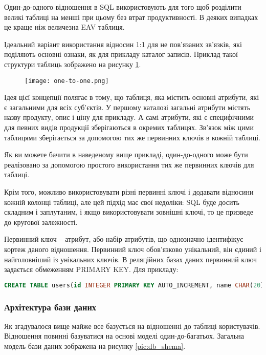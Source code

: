 \par Один-до-одного відношення в SQL використовують для того щоб розділити великі таблиці на менші при цьому без втрат продуктивності. В деяких випадках це краще ніж величезна EAV \cite{EAV} таблиця. 
\par Ідеальний варіант використання відносин 1:1 для не пов'язаних зв'язків, які поділяють основні ознаки, як для прикладу каталог записів. Приклад такої структури таблиць зображено на рисунку \ref{pic:one_to_one.png}.
\begin{figure}[!ht]
\centering
		\texttt{[image: one-to-one.png]}
		\vspace{18pt}
		\label{pic:one_to_one.png}
\end{figure}
\par Ідея цієї концепції полягає в тому, що таблиця, яка містить основні атрибути, які є загальними для всіх суб'єктів. У першому каталозі загальні атрибути містять назву продукту, опис і ціну для прикладу. А самі атрибути, які є специфічними для певних видів продукції зберігаються в окремих таблицях. Зв'язок між цими таблицями зберігається за допомогою тих же первинних ключів в кожній таблиці.
\par Як ви можете бачити в наведеному вище прикладі, один-до-одного може бути реалізовано за допомогою простого використання тих же первинних ключів для таблиці. 
\par Крім того, можливо використовувати різні первинні ключі і додавати відносини кожній колонці таблиці, але цей підхід має свої недоліки: SQL буде досить складним і заплутаним, і якщо використовувати зовнішні ключі, то це призведе до кругової залежності.
\par Первинний ключ -- атрибут, або набір атрибутів, що однозначно ідентифікує кортеж даного відношення. Первинний ключ обов'язково унікальний, він єдиний і найголовніший із унікальних ключів.
В реляційних базах даних первинний ключ задається обмеженням PRIMARY KEY. Для прикладу:
\begin{lstlisting}[language=SQL]
CREATE TABLE users(id INTEGER PRIMARY KEY AUTO_INCREMENT, name CHAR(20), surname CHAR(40));
\end{lstlisting}


\subsubsection{Архітектура бази даних}
Як згадувалося вище майже все базується на відношенні до таблиці користувачів. Відношення повинні базуватися на основі моделі один-до-багатьох. Загальна модель бази даних зображена на рисунку \ref{pic:db_shema}.
	
